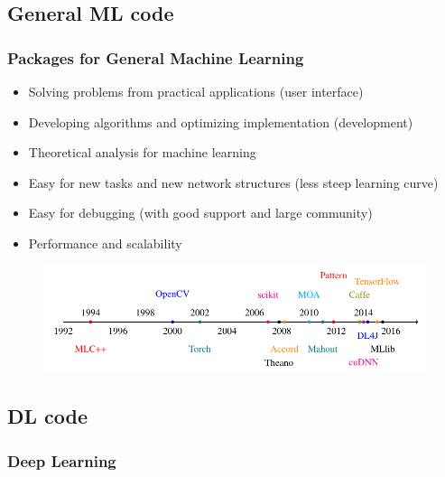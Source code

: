 \subsection{General ML code}

\begin{frame}
  \MyLogo
  \frametitle{Packages for General Machine Learning}  
\small

\begin{itemize}
\item Solving problems from practical applications (user interface)
\item Developing algorithms and optimizing implementation (development)
\item Theoretical analysis for machine learning
\end{itemize}

\begin{itemize}
\item Easy for new tasks and new network structures (less steep learning curve)
\item Easy for debugging (with good support and large community)
\item Performance and scalability
\end{itemize}

\vskip -5pt
\begin{figure}[htbp] %
   \centering
   \includegraphics[width=\linewidth]{figures/ML.pdf} 
\end{figure}

\end{frame}

\subsection{DL code}

\begin{frame}
  \MyLogo
  \frametitle{Deep Learning}  

\end{frame}

